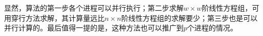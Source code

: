 \documentclass[UTF8,nofonts]{ctexart}
\begin{document}
显然，算法的第一步各个进程可以并行执行；第二步求解$w \times w$阶线性方程组，可用穿行方法求解，其计算量远比$n \times n$阶线性方程组的求解要少；第三步也是可以并行计算的。最后值得一提的是，这种方法也可以推广到$p$个进程的情况。

\subsection*{}

\end{document}
